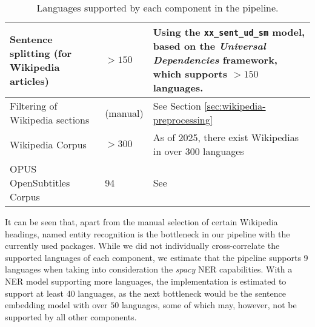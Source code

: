 {\begin{table}[H]
\begin{tabularx}{\textwidth}{|X|X|X|}
		Sentence splitting (for Wikipedia articles) & $>150$                       & Using the \texttt{xx\_sent\_ud\_sm} model\footnotemark[6], based on the \textit{Universal Dependencies} framework\footnotemark[7], which supports $>150$ languages.                                                                        \\
		\hline
		Filtering of Wikipedia sections             & (manual)                     & See Section \ref{sec:wikipedia-preprocessing}                                                                                                                                                                                              \\
		\hline
		Wikipedia Corpus                            & $>300$                       & As of 2025, there exist Wikipedias in over 300 languages\footnotemark[8]                                                                                                                                                                   \\
		\hline
		OPUS OpenSubtitles Corpus                   & 94                           & See \footnotemark[9]                                                                                                                                                                                                                       \\
		\hline
	\end{tabularx}



	\caption{Languages supported by each component in the pipeline.}
	\label{table:supported-languages}
\end{table}
}


It can be seen that, apart from the manual selection of certain Wikipedia headings, named entity recognition is the bottleneck in our pipeline with the currently used packages.
While we did not individually cross-correlate the supported languages of each component, we estimate that the pipeline supports 9 languages when taking into consideration the \textit{spacy} NER capabilities.
With a NER model supporting more languages, the implementation is estimated to support at least 40 languages, as the next bottleneck would be the sentence embedding model with over $50$ languages, some of which may, however, not be supported by all other components.



